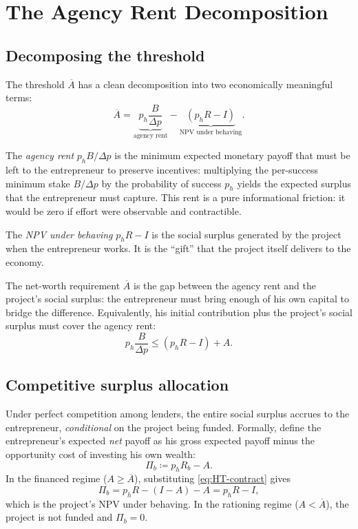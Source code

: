 \documentclass[11pt,a4paper,oneside]{book}
\def\leq{\leqslant}
\def\geq{\geqslant}
\theoremstyle{plain}
\theoremstyle{definition}
\theoremstyle{remark}
\numberwithin{equation}{chapter}
\begin{document}
\section{The Agency Rent Decomposition}
\label{sec:HT-agency-rent}

\subsection{Decomposing the threshold}

The threshold $\overline{A}$ has a clean decomposition into two economically meaningful terms:
\begin{equation}\label{eq:HT-rent-decomp}
  \overline{A} = \underbrace{p_h \frac{B}{\Delta p}}_{\text{agency rent}} - \underbrace{(p_h R - I)}_{\text{NPV under behaving}}.
\end{equation}

The \emph{agency rent} $p_h B / \Delta p$ is the minimum expected monetary payoff that must be left to the entrepreneur to preserve incentives: multiplying the per-success minimum stake $B/\Delta p$ by the probability of success $p_h$ yields the expected surplus that the entrepreneur must capture.
This rent is a pure informational friction: it would be zero if effort were observable and contractible.

The \emph{NPV under behaving} $p_h R - I$ is the social surplus generated by the project when the entrepreneur works.
It is the ``gift'' that the project itself delivers to the economy.

The net-worth requirement $\overline{A}$ is the gap between the agency rent and the project's social surplus: the entrepreneur must bring enough of his own capital to bridge the difference.
Equivalently, his initial contribution plus the project's social surplus must cover the agency rent:
\begin{equation*}
  p_h \frac{B}{\Delta p} \leq (p_h R - I) + A.
\end{equation*}

\subsection{Competitive surplus allocation}

Under perfect competition among lenders, the entire social surplus accrues to the entrepreneur, \emph{conditional} on the project being funded.
Formally, define the entrepreneur's expected \emph{net} payoff as his gross expected payoff minus the opportunity cost of investing his own wealth:
\begin{equation*}
  \Pi_b \coloneqq p_h R_b - A.
\end{equation*}
In the financed regime ($A \geq \overline{A}$), substituting \eqref{eq:HT-contract} gives
\begin{equation*}
  \Pi_b = p_h R - (I - A) - A = p_h R - I,
\end{equation*}
which is the project's NPV under behaving.
In the rationing regime ($A < \overline{A}$), the project is not funded and $\Pi_b = 0$.
\end{document}
